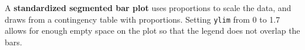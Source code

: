 \documentclass{report}\usepackage[]{graphicx}\usepackage[]{color}
\begin{document}



\newpage

A \textbf{standardized segmented bar plot} uses proportions to scale the data, and draws from a contingency table with proportions. Setting \texttt{ylim} from 0 to 1.7 allows for enough empty space on the plot so that the legend does not overlap the bars.
\end{document}
